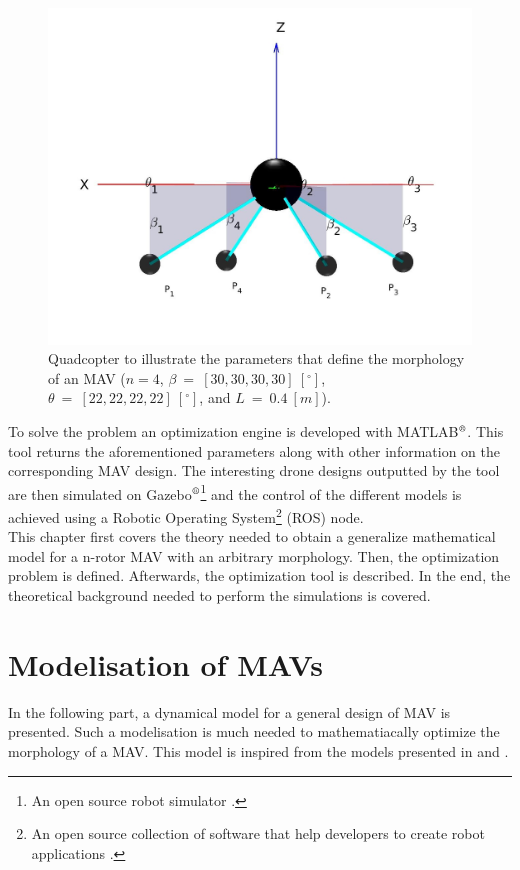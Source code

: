 \begin{figure}[h]
\begin{minipage}[t]{0.3\textwidth}
  \centering
  \includegraphics[width=\textwidth]{images/drone_design2.jpg}
\end{minipage}
\caption{Quadcopter to illustrate the parameters that define the morphology of an
MAV ($n = 4$, $\beta\ =\ [30, 30, 30, 30]\ [^{\circ}]$, $\theta\ =\ [22, 22, 22, 22]\
[^{\circ}]$, and $L\ =\ 0.4\ [m]$).}
\label{fig:drone_design}
\end{figure}

To solve the problem an optimization engine is developed with
MATLAB$^\textrm{\textregistered}$. This tool returns the aforementioned
parameters along with other information on the corresponding MAV design.
The interesting drone designs outputted by the tool are then simulated on
Gazebo$^\textrm{\textregistered}$\footnote{An open source robot simulator \citep{noauthor_gazebo_nodate}.}
and the control of the different models is achieved using a Robotic Operating
System\footnote{An open source collection of software that help developers to
create robot applications \citep{rostutorials}.} (ROS) node.\\
This chapter first covers the theory needed to obtain a generalize mathematical
model for a n-rotor MAV with an arbitrary morphology. Then, the optimization
problem is defined. Afterwards, the optimization tool is described. In the end,
the theoretical background needed to perform the simulations is covered.

\section{Modelisation of MAVs}
\label{sec:modeling_mav}
In the following part, a dynamical model for a general design of MAV is presented.
Such a modelisation is much needed to mathematiacally optimize the morphology of
a MAV. This model is inspired from the models presented in
\citep{kamel_voliro:_2018} and \citep{ryll_modeling_2012}.


